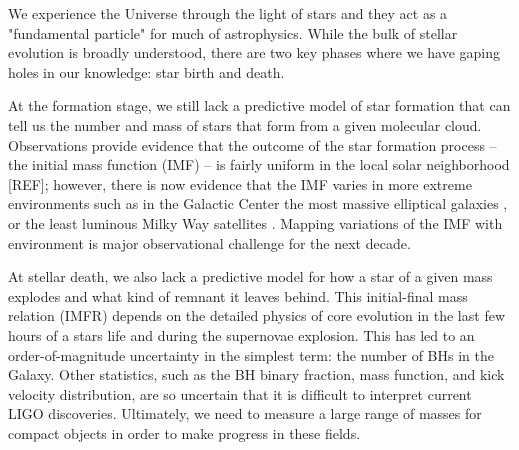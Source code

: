 \documentclass[11pt]{article}
\begin{document}
%


%

\sciencejustification

We experience the Universe through the light of stars and they 
act as a "fundamental particle" for much of astrophysics. 
While the bulk of stellar evolution is broadly understood, there are two key phases where we have gaping holes in our knowledge: star birth and death. 

At the formation stage, we still lack a predictive model of star formation that can tell us the number and mass of stars that form from a given molecular cloud. 
Observations provide evidence that the outcome of the star formation
process -- the initial mass function (IMF) -- is fairly uniform in the
local solar neighborhood [REF]; 
however, there is now evidence that the IMF varies in more extreme environments such as in the Galactic Center \citep{Lu:2013,Hosek:2018} the most massive elliptical galaxies \citep{vanDokkum:2010}, or the least luminous Milky Way satellites \citep{Geha:2013}. 
Mapping variations of the IMF with environment is major observational challenge for the next decade. 

At stellar death, we also lack a predictive model for how a star of a
given mass explodes and what kind of remnant it leaves behind. 
This initial-final mass relation (IMFR) depends on the detailed physics of
core evolution in the last few hours of a stars life and during the
supernovae explosion. 
This has led to an order-of-magnitude uncertainty in the simplest
term: the number of BHs in the Galaxy. Other statistics, such as the
BH binary fraction, mass function, and kick velocity distribution, are
so uncertain that it is difficult to interpret current LIGO
discoveries. Ultimately, we need to measure a large range of masses
for compact objects in order to make progress in these fields. 
\end{document}
